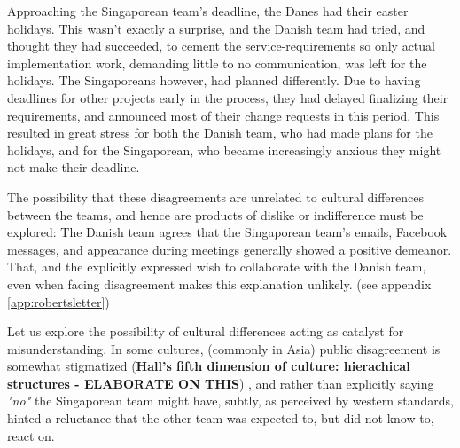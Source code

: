 Approaching the Singaporean team's deadline, the Danes had their easter
holidays. This wasn't exactly a surprise, and the Danish team had tried, and
thought they had succeeded, to cement the service-requirements so only actual
implementation work, demanding little to no communication, was left for the
holidays. The Singaporeans however, had planned differently. Due to having deadlines
for other projects early in the process, they had delayed finalizing their
requirements, and announced most of their change requests in this period. This
resulted in great stress for both the Danish team, who had made plans for the
holidays, and for the Singaporean, who became increasingly anxious they might not
make their deadline.

The possibility that these disagreements are unrelated to cultural differences
between the teams, and hence are products of dislike or indifference must be
explored: The Danish team agrees that the Singaporean team's emails, Facebook messages,
and appearance during meetings generally showed a positive demeanor. That, and
the explicitly expressed wish to collaborate with the Danish team, even when
facing disagreement makes this explanation unlikely. (see appendix
\ref{app:robertsletter})

Let us explore the possibility of cultural differences acting as catalyst for
misunderstanding. In some cultures, (commonly in Asia) public disagreement is
somewhat stigmatized (\textbf{Hall's fifth dimension of culture: hierachical structures - ELABORATE ON THIS})
\cite{surprises}\cite{herbsiemens}, and rather than explicitly saying \emph{"no"} the Singaporean team
might have, subtly, as perceived by western standards, hinted a reluctance that
the other team was expected to, but did not know to, react on.

